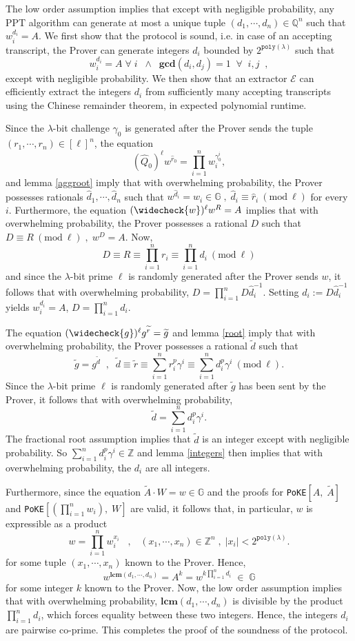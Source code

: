 \documentclass[11pt, lettersize, notitlepage, leqno, footskip=0.6cm]{article}
\newcommand{\bz}{\mathbb Z}
\newcommand{\bq}{\mathbb Q}
\newcommand{\pl}{\prod\limits}
\newcommand{\slim}{\sum\limits}
\newcommand{\ttt}{\texttt}
\newcommand{\bG}{\mathbb{G}}
\newcommand{\wti}{\widetilde}
\newcommand{\mc}{\mathcal}
\newcommand{\mbf}{\mathbf}
\newcommand{\lam}{\lambda}
\newcommand{\what}{\widehat}
\newcommand{\weck}{\widecheck}
\newcommand{\vs}{\vspace{-0.15cm}}
\newcommand{\op}{overwhelming probability}
\newcommand{\np}{negligible probability}
\newcommand{\Mod}[1]{\ (\mathrm{mod}\ #1)}
\newcommand{\LCM}{\mbf{lcm}}
\newcommand{\GCD}{\mbf{gcd}}
\newcommand{\E}{\mc{E}}
\numberwithin{equation}{section}
\begin{document}
\begin{prf} The low order assumption implies that except with \np, any PPT algorithm can generate at most a unique tuple $(d_1,\cdots,d_n)\in \bq^n$ such that $w_i^{d_i} = A$. We first show that the protocol is sound, i.e. in case of an accepting transcript, the Prover can generate integers $d_i$ bounded by $2^{\ttt{poly}(\lam)}$ such that \vs $$w_i^{d_i} = A\;\forall\; i\;\;\wedge\;\;\GCD(d_i,d_j) = 1\;\;\forall\;\; i,j\;\;, $$ except with \np. We then show that an extractor $\E$ can efficiently extract the integers $d_i$ from sufficiently many accepting transcripts using the Chinese remainder theorem, in expected polynomial runtime.

Since the $\lam$-bit challenge $\gamma_{0}$ is generated after the Prover sends the tuple $(r_1,\cdots,r_n)\in[\ell]^n$, the equation \vs $$(\what{Q}_0)^{\ell}w^{\what{r}_0} = \pl_{i=1}^n w_i^{\gamma_{0}^i}, $$ and lemma \ref{aggroot} imply that with \op, the Prover possesses rationals $\what{d}_1,\cdots,\what{d}_n$ such that $w^{\what{d}_i} = w_i\in \bG\;,\;\what{d}_i\equiv \what{r}_i\Mod{\ell}$ for every $i$. Furthermore, the equation $(\weck{w})^{\ell}w^R = A$ implies that with \op, the Prover possesses a rational $D$ such that $D\equiv R\Mod{\ell}\;,\;w^{D} =A$. Now, \vs $$D\equiv R\equiv \pl_{i=1}^n r_i \equiv \pl_{i=1}^n d_i\Mod{\ell}$$ and since the $\lam$-bit prime $\ell$ is randomly generated after the Prover sends $w$, it follows that with \op, $D = \prod_{i=1}^n D\what{d}_i^{-1}$. Setting $d_i:= D\what{d}_i^{-1}$ yields $w_i^{d_i} = A$, $ D = \prod_{i=1}^n d_i.$  

The equation $(\weck{g})^{\ell}g^{\wti{r}}=\wti{g}$ and lemma \ref{root} imply that with \op, the Prover possesses a rational $\wti{d}$ such that \vs $$\wti{g} = g^{\wti{d}}\;\;,\;\; \wti{d}\equiv \wti{r}\equiv\slim_{i=1}^n r_i^p\gamma^i\equiv \slim_{i=1}^n d_i^p\gamma^i \Mod{\ell}.$$ Since the $\lam$-bit prime $\ell$ is randomly generated after $\wti{g}$ has been sent by the Prover, it follows that with \op, \vs $$\wti{d} = \slim_{i=1}^n d_i^p\gamma^i.$$ The fractional root assumption implies that $\wti{d}$ is an integer except with \np. So $\sum_{i=1}^n d_i^p\gamma^i\in \bz$ and lemma \ref{integers} then implies that with \op, the $d_i$ are all integers. 

Furthermore, since the equation $\wti{A}\cdot W = w \in \bG$ and the proofs for \verb|PoKE|$[A,\;\wti{A}]$ and \verb|PoKE|$[(\prod_{i=1}^n w_i),\; W]$ are valid, it follows that, in particular, $w$ is expressible as a product \vs $$w =\pl_{i=1}^n w_i^{x_i}\;\;\;,\;\;\;(x_1,\cdots,x_n)\in\bz^n \;,\;|x_i|< 2^{\ttt{poly}(\lam)}.$$ for some tuple $(x_1,\cdots,x_n)$ known to the Prover. Hence, \vs $$w^{\LCM(d_1,\cdots,d_n)} = A^k = w^{k\pl_{i=1}^n d_i}\;\in\;\bG$$ for some integer $k$ known to the Prover. Now, the low order assumption implies that with \op, $\LCM(d_1,\cdots,d_n)$ is divisible by the product $\prod_{i=1}^n d_i$, which forces equality between these two integers. Hence, the integers $d_i$ are pairwise co-prime. This completes the proof of the soundness of the protocol.


\end{prf}
\end{document}
